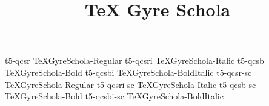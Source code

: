 \documentclass[test]{vnsample}
\title{TeX Gyre Schola}
\begin{document}
\begin{shortsample}
    {t5-qcsr}     {TeXGyreSchola-Regular}
   {t5-qcsri}    {TeXGyreSchola-Italic}
    {t5-qcsb}     {TeXGyreSchola-Bold}
   {t5-qcsbi}    {TeXGyreSchola-BoldItalic}
   {t5-qcsr-sc}  {TeXGyreSchola-Regular}
 {t5-qcsri-sc} {TeXGyreSchola-Italic}
   {t5-qcsb-sc}  {TeXGyreSchola-Bold}
 {t5-qcsbi-sc} {TeXGyreSchola-BoldItalic}
\end{shortsample}
\end{document}

